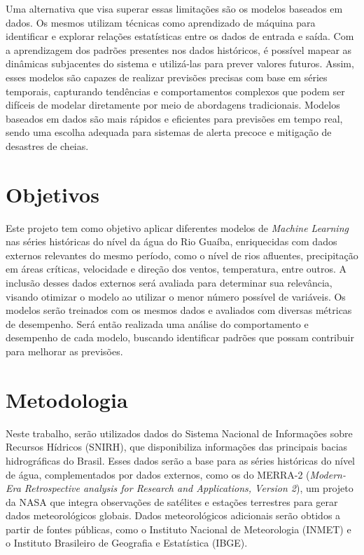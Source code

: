 \documentclass[
	12pt,				%
	openright,			%
	a4paper,			%
	english,			%
	french,				%
	spanish,			%
	brazil				%
	]{article}
\begin{document}
Uma alternativa que visa superar essas limitações são os modelos baseados em dados. Os mesmos utilizam técnicas como aprendizado de máquina para identificar e explorar relações estatísticas entre os dados de entrada e saída. Com a aprendizagem dos padrões presentes nos dados históricos, é possível mapear as dinâmicas subjacentes do sistema e utilizá-las para prever valores futuros. Assim, esses modelos são capazes de realizar previsões precisas com base em séries temporais, capturando tendências e comportamentos complexos que podem ser difíceis de modelar diretamente por meio de abordagens tradicionais. Modelos baseados em dados são mais rápidos e eficientes para previsões em tempo real, sendo uma escolha adequada para sistemas de alerta precoce e mitigação de desastres de cheias\cite{ta}.

\section{Objetivos}
Este projeto tem como objetivo aplicar diferentes modelos de \textit{Machine Learning} nas séries históricas do nível da água do Rio Guaíba, enriquecidas com dados externos relevantes do mesmo período, como o nível de rios afluentes, precipitação em áreas críticas, velocidade e direção dos ventos, temperatura, entre outros. A inclusão desses dados externos será avaliada para determinar sua relevância, visando otimizar o modelo ao utilizar o menor número possível de variáveis. Os modelos serão treinados com os mesmos dados e avaliados com diversas métricas de desempenho. Será então realizada uma análise do comportamento e desempenho de cada modelo, buscando identificar padrões que possam contribuir para melhorar as previsões.

\section{Metodologia}
Neste trabalho, serão utilizados dados do Sistema Nacional de Informações sobre Recursos Hídricos (SNIRH), que disponibiliza informações das principais bacias hidrográficas do Brasil\cite{snirh}. Esses dados serão a base para as séries históricas do nível de água, complementados por dados externos, como os do MERRA-2 (\textit{Modern-Era Retrospective analysis for Research and Applications, Version 2}), um projeto da NASA que integra observações de satélites e estações terrestres para gerar dados meteorológicos globais\cite{nasa}. Dados meteorológicos adicionais serão obtidos a partir de fontes públicas, como o Instituto Nacional de Meteorologia (INMET) e o Instituto Brasileiro de Geografia e Estatística (IBGE)\cite{inmet}\cite{ibge}.
\end{document}
